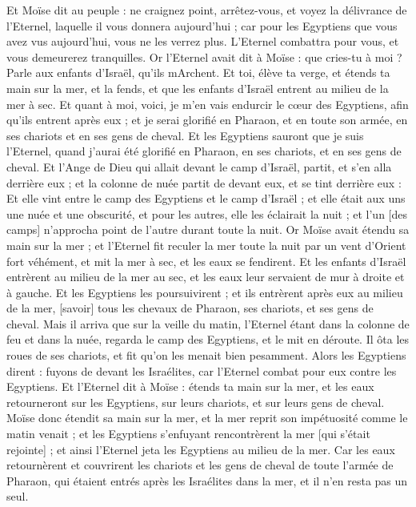 \begin{multicols}{2}
Et Moïse dit au peuple : ne craignez point, arrêtez-vous, et voyez la délivrance de l'Eternel, laquelle il vous donnera aujourd'hui ; car pour les Egyptiens que vous avez vus aujourd'hui, vous ne les verrez plus.
L'Eternel combattra pour vous, et vous demeurerez tranquilles.
Or l'Eternel avait dit à Moïse : que cries-tu à moi ? Parle aux enfants d'Israël, qu'ils mArchent.
Et toi, élève ta verge, et étends ta main sur la mer, et la fends, et que les enfants d'Israël entrent au milieu de la mer à sec.
Et quant à moi, voici, je m'en vais endurcir le cœur des Egyptiens, afin qu'ils entrent après eux ; et je serai glorifié en Pharaon, et en toute son armée, en ses chariots et en ses gens de cheval.
Et les Egyptiens sauront que je suis l'Eternel, quand j'aurai été glorifié en Pharaon, en ses chariots, et en ses gens de cheval.
Et l'Ange de Dieu qui allait devant le camp d'Israël, partit, et s'en alla derrière eux ; et la colonne de nuée partit de devant eux, et se tint derrière eux :
Et elle vint entre le camp des Egyptiens et le camp d'Israël ; et elle était aux uns une nuée et une obscurité, et pour les autres, elle les éclairait la nuit ; et l'un [des camps] n'approcha point de l'autre durant toute la nuit.
Or Moïse avait étendu sa main sur la mer ; et l'Eternel fit reculer la mer toute la nuit par un vent d'Orient fort véhément, et mit la mer à sec, et les eaux se fendirent.
Et les enfants d'Israël entrèrent au milieu de la mer au sec, et les eaux leur servaient de mur à droite et à gauche.
Et les Egyptiens les poursuivirent ; et ils entrèrent après eux au milieu de la mer, [savoir] tous les chevaux de Pharaon, ses chariots, et ses gens de cheval.
Mais il arriva que sur la veille du matin, l'Eternel étant dans la colonne de feu et dans la nuée, regarda le camp des Egyptiens, et le mit en déroute.
Il ôta les roues de ses chariots, et fit qu'on les menait bien pesamment. Alors les Egyptiens dirent : fuyons de devant les Israélites, car l'Eternel combat pour eux contre les Egyptiens.
Et l'Eternel dit à Moïse : étends ta main sur la mer, et les eaux retourneront sur les Egyptiens, sur leurs chariots, et sur leurs gens de cheval.
Moïse donc étendit sa main sur la mer, et la mer reprit son impétuosité comme le matin venait ; et les Egyptiens s'enfuyant rencontrèrent la mer [qui s'était rejointe] ; et ainsi l'Eternel jeta les Egyptiens au milieu de la mer.
Car les eaux retournèrent et couvrirent les chariots et les gens de cheval de toute l'armée de Pharaon, qui étaient entrés après les Israélites dans la mer, et il n'en resta pas un seul.

\end{multicols}
